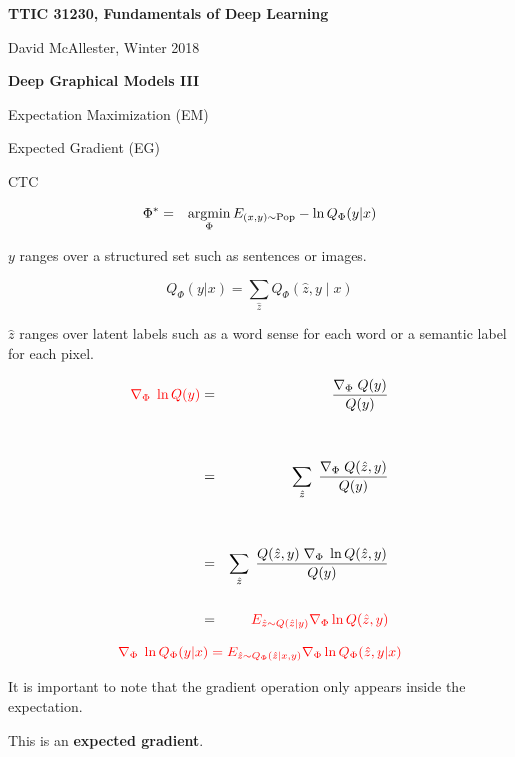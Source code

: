



{\Huge

  \centerline{\bf TTIC 31230, Fundamentals of Deep Learning}
  \bigskip
  \centerline{David McAllester, Winter 2018}
  \vfill
  \centerline{\bf Deep Graphical Models III}
  \vfill
  \vfill
  \centerline{Expectation Maximization (EM)}
  \vfill
  \centerline{Expected Gradient (EG)}
  \vfill
  \centerline{CTC}
  \vfill
\vfill
{}

\begin{eqnarray*}
\Phi^* & = & \operatorname*{argmin}_\Phi E_{(x,y) \sim \mathrm{Pop}} - \ln Q_\Phi(y|x)
\end{eqnarray*}

\vfill
$y$ ranges over a structured set such as sentences or images.

\vfill
$$Q_\Phi(y|x) = \sum_{\hat{z}} Q_\Phi(\hat{z},y\;|\;x)$$

\vfill
$\hat{z}$ ranges over latent labels such as a word sense for each word or a semantic label for each pixel.


\begin{eqnarray*}
{\color{red} \nabla_\Phi \; \ln Q(y)} & = &  \frac{\nabla_\Phi\; Q(y)}{Q(y)} \\
\\
\\
 & = &  \sum_{\hat{z}}\; \frac{\nabla_\Phi\;Q(\hat{z},y)}{Q(y)} \\
 \\
 \\
  & = &  \sum_{\hat{z}}\; \frac{Q(\hat{z},y)\;  \nabla_\Phi \; \ln Q(\hat{z},y)}{Q(y)} \\
\\
 & = & {\color{red} E_{\hat{z} \sim Q(\hat{z}|y)} \nabla_\Phi \ln Q(\hat{z},y)} \\
\end{eqnarray*}




$${\color{red} \nabla_\Phi \; \ln Q_\Phi(y|x) = E_{\hat{z} \sim Q_\Phi(\hat{z}|x,y)} \nabla_\Phi \ln Q_\Phi(\hat{z},y|x)}$$

\vfill
It is important to note that the gradient operation only appears inside the expectation.

\vfill
This is an {\bf expected gradient}.


}
